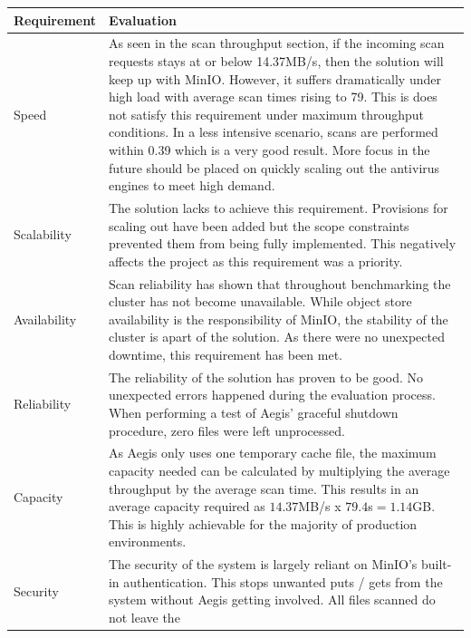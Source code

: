 \documentclass[12pt, conference, final, a4paper, onecolumn, compsoc]{IEEEtran}
\begin{document}
\begin{table}[H]
  \centering
  \begin{tabular}{|p{}|p{}|}
    \hline
    \textbf{Requirement} & \textbf{Evaluation} \\ \hline
    Speed & As seen in the scan throughput section, if the incoming scan
            requests stays at or below 14.37MB/s, then the solution will keep up
    with MinIO. However, it suffers dramatically under high load with average
            scan times rising to 79. This is does not satisfy this requirement
            under maximum throughput conditions. In a less intensive
            scenario, scans are performed within 0.39 which is a very good
            result. More focus in the future should be placed on quickly scaling
    out the antivirus engines to meet high demand.\\ \hline
    Scalability & The solution lacks to achieve this requirement. Provisions for
          scaling out have been added but the scope constraints prevented them
                  from being fully implemented. This negatively affects the
                  project as this requirement was a priority. \\ \hline
    Availability & Scan reliability has shown that throughout benchmarking the
                   cluster has not become unavailable. While object store
                   availability is the responsibility of MinIO, the stability of
    the cluster is apart of the solution. As there were no unexpected downtime,
                   this requirement has been met. \\ \hline
    Reliability & The reliability of the solution has proven to be good. No
                  unexpected errors happened during the evaluation process. When
    performing a test of Aegis' graceful shutdown procedure, zero files were
                  left unprocessed.\\ \hline
    Capacity & As Aegis only uses one temporary cache file, the maximum capacity
               needed can be calculated by multiplying the average throughput by
               the average scan time. This results in an average capacity
               required as $14.37$MB/s x $79.4$s$ = 1.14$GB. This is
               highly achievable for the majority of production environments. \\ \hline
    Security & The security of the system is largely reliant on MinIO's built-in
    authentication. This stops unwanted puts / gets from the system without
               Aegis getting involved. All files scanned do not leave the

\end{tabular}
\end{table}
\end{document}
